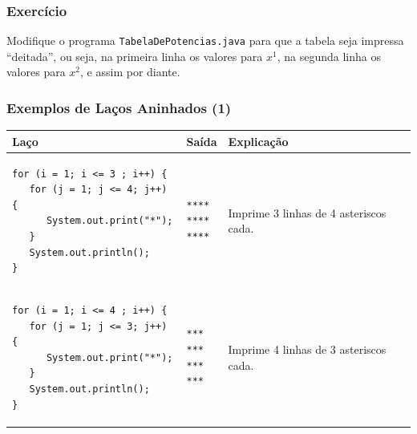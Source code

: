 \documentclass[xcolor={dvipsnames,table},aspectratio=169]{beamer}
\begin{document}
\begin{frame}[fragile]\frametitle{Exercício}
Modifique o programa \texttt{TabelaDePotencias.java} para que a tabela seja impressa ``deitada'', ou seja, na primeira linha os valores para $x^1$, na segunda linha os valores para $x^2$, e assim por diante.
\end{frame}

\begin{frame}[fragile]\frametitle{Exemplos de Laços Aninhados (1)}
\begin{center}
  \begin{tabular}{|p{6cm}|p{2cm}|p{5cm}|}
\hline
    \textbf{Laço} & \textbf{Saída} & \textbf{Explicação} \\
\hline
{\tiny
\begin{verbatim}
for (i = 1; i <= 3 ; i++) {
   for (j = 1; j <= 4; j++) {
      System.out.print("*");
   }
   System.out.println();
}
\end{verbatim}
}
&
{\tiny
\begin{verbatim}
****
****
****
\end{verbatim}
}
& Imprime 3 linhas de 4 asteriscos cada.\\
\hline
{\tiny
\begin{verbatim}
for (i = 1; i <= 4 ; i++) {
   for (j = 1; j <= 3; j++) {
      System.out.print("*");
   }
   System.out.println();
}
\end{verbatim}
}
&
{\tiny
\begin{verbatim}
***
***
***
***
\end{verbatim}
}
& Imprime 4 linhas de 3 asteriscos cada.\\
\hline
  \end{tabular}
\end{center}
\end{frame}
\end{document}

